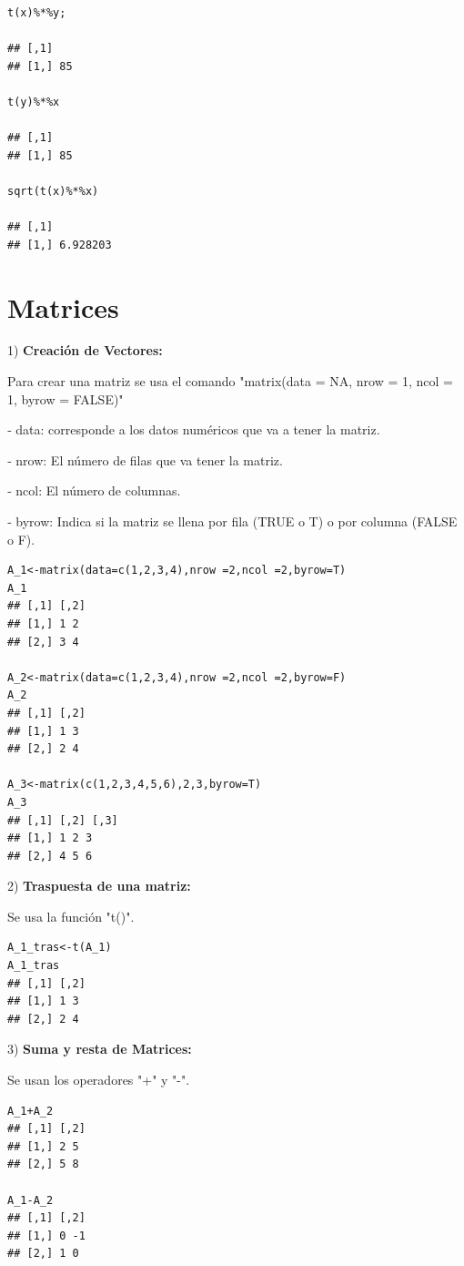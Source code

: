 \documentclass[12pt,letterpaper]{report} %
\begin{document}
\begin{lstlisting}
t(x)%*%y;

## [,1]
## [1,] 85

t(y)%*%x

## [,1]
## [1,] 85

sqrt(t(x)%*%x)

## [,1]
## [1,] 6.928203
\end{lstlisting}

\section{Matrices}

1) \textbf{Creación de Vectores:}

Para crear una matriz se usa el comando 
"matrix(data = NA, nrow = 1, ncol = 1, byrow = FALSE)"

‐ data: corresponde a los datos numéricos que va a tener la matriz.

‐ nrow: El número de filas que va tener la matriz.

‐ ncol: El número de columnas.

‐ byrow: Indica si la matriz se llena por fila (TRUE o T) o por columna (FALSE o F).

\begin{lstlisting}
A_1<-matrix(data=c(1,2,3,4),nrow =2,ncol =2,byrow=T)
A_1
## [,1] [,2]
## [1,] 1 2
## [2,] 3 4

A_2<-matrix(data=c(1,2,3,4),nrow =2,ncol =2,byrow=F)
A_2
## [,1] [,2]
## [1,] 1 3
## [2,] 2 4

A_3<-matrix(c(1,2,3,4,5,6),2,3,byrow=T)
A_3
## [,1] [,2] [,3]
## [1,] 1 2 3
## [2,] 4 5 6
\end{lstlisting}

2) \textbf{Traspuesta de una matriz:}

Se usa la función "t()".

\begin{lstlisting}
A_1_tras<-t(A_1)
A_1_tras
## [,1] [,2]
## [1,] 1 3
## [2,] 2 4
\end{lstlisting}

3) \textbf{Suma y resta de Matrices:}

Se usan los operadores "+" y "-".

\begin{lstlisting}
A_1+A_2
## [,1] [,2]
## [1,] 2 5
## [2,] 5 8

A_1-A_2
## [,1] [,2]
## [1,] 0 -1
## [2,] 1 0
\end{lstlisting}
\end{document}
